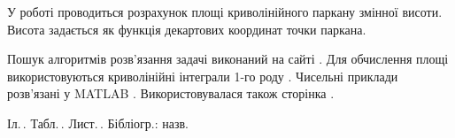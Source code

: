 \label{sec:Refer}


\hspace*{26pt} У роботі проводиться розрахунок площі криволінійного паркану змінної висоти. Висота задається як функція декартових координат точки паркана.

Пошук алгоритмів розв’язання задачі виконаний на сайті \cite{GoogleWebPage}. Для обчислення площі використовуються криволінійні інтеграли 1-го роду \cite{Senchuk2006}. Чисельні приклади розв’язані у MATLAB \cite{Anufriev2005}. Використовувалася також сторінка \cite{IglinWebPage}.

\vspace{0.25cm}

Іл.\,\totfig. Табл.\,\tottab. Лист.\,\totalg. Бібліогр.:\,\totref\,назв.


